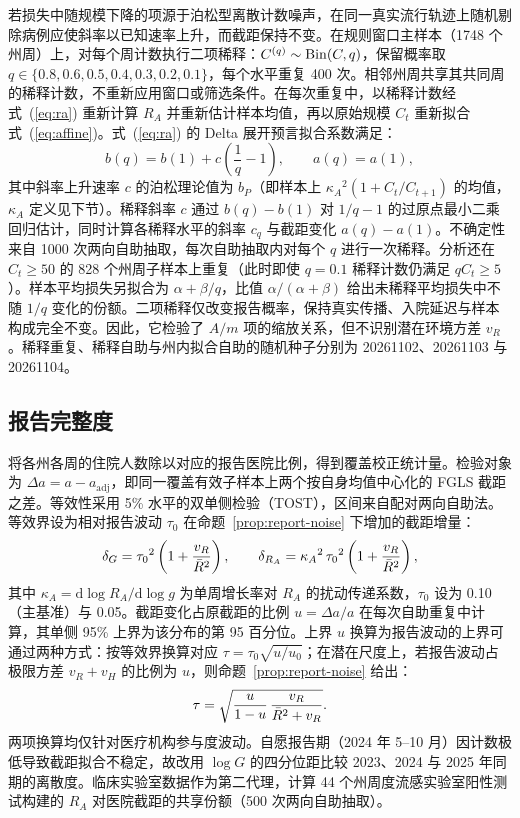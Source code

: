 若损失中随规模下降的项源于泊松型离散计数噪声，在同一真实流行轨迹上随机剔除病例应使斜率以已知速率上升，而截距保持不变。在规则窗口主样本（1748 个州周）上，对每个周计数执行二项稀释：$C^{(q)}\sim\mathrm{Bin}(C,q)$，保留概率取 $q\in\{0.8,0.6,0.5,0.4,0.3,0.2,0.1\}$，每个水平重复 400 次。相邻州周共享其共同周的稀释计数，不重新应用窗口或筛选条件。在每次重复中，以稀释计数经式~(\ref{eq:ra}) 重新计算 $R_A$ 并重新估计样本均值，再以原始规模 $C_t$ 重新拟合式~(\ref{eq:affine})。式~(\ref{eq:ra}) 的 Delta 展开预言拟合系数满足：
\begin{equation}
  b(q)=b(1)+c\left(\frac{1}{q}-1\right),\qquad a(q)=a(1),
  \label{eq:thinning}
\end{equation}
其中斜率上升速率 $c$ 的泊松理论值为 $b_P$（即样本上 $\kappa_A{}^2(1+C_t/C_{t+1})$ 的均值，$\kappa_A$ 定义见下节）。稀释斜率 $c$ 通过 $b(q)-b(1)$ 对 $1/q-1$ 的过原点最小二乘回归估计，同时计算各稀释水平的斜率 $c_q$ 与截距变化 $a(q)-a(1)$。不确定性来自 1000 次两向自助抽取，每次自助抽取内对每个 $q$ 进行一次稀释。分析还在 $C_t\ge50$ 的 828 个州周子样本上重复（此时即使 $q=0.1$ 稀释计数仍满足 $qC_t\ge5$）。样本平均损失另拟合为 $\alpha+\beta/q$，比值 $\alpha/(\alpha+\beta)$ 给出未稀释平均损失中不随 $1/q$ 变化的份额。二项稀释仅改变报告概率，保持真实传播、入院延迟与样本构成完全不变。因此，它检验了 $A/m$ 项的缩放关系，但不识别潜在环境方差 $v_R$。稀释重复、稀释自助与州内拟合自助的随机种子分别为 20261102、20261103 与 20261104。

\subsection{报告完整度}
\label{sec:meth-reporting}

将各州各周的住院人数除以对应的报告医院比例，得到覆盖校正统计量。检验对象为 $\Delta a=a-a_{\mathrm{adj}}$，即同一覆盖有效子样本上两个按自身均值中心化的 FGLS 截距之差。等效性采用 5\% 水平的双单侧检验（TOST），区间来自配对两向自助法\citep{schuirmann1987comparison}。等效界设为相对报告波动 $\tau_0$ 在命题~\ref{prop:report-noise} 下增加的截距增量：
\begin{equation}
  \delta_G=\tau_0{}^2\left(1+\frac{v_R}{\bar{R}^2}\right),\qquad
  \delta_{R_A}=\kappa_A{}^2\,\tau_0{}^2\left(1+\frac{v_R}{\bar{R}^2}\right),
  \label{eq:tost}
\end{equation}
其中 $\kappa_A=\mathrm{d}\log R_A/\mathrm{d}\log g$ 为单周增长率对 $R_A$ 的扰动传递系数，$\tau_0$ 设为 0.10（主基准）与 0.05。截距变化占原截距的比例 $u=\Delta a/a$ 在每次自助重复中计算，其单侧 95\% 上界为该分布的第 95 百分位。上界 $u$ 换算为报告波动的上界可通过两种方式：按等效界换算对应 $\tau=\tau_0\sqrt{u/u_0}$；在潜在尺度上，若报告波动占极限方差 $v_R+v_H$ 的比例为 $u$，则命题~\ref{prop:report-noise} 给出：
\begin{equation}
  \tau=\sqrt{\frac{u}{1-u}\,\frac{v_R}{\bar{R}^2+v_R}}.
  \label{eq:tau-latent}
\end{equation}
两项换算均仅针对医疗机构参与度波动。自愿报告期（2024 年 5--10 月）因计数极低导致截距拟合不稳定，故改用 $\log G$ 的四分位距比较 2023、2024 与 2025 年同期的离散度。临床实验室数据作为第二代理，计算 44 个州周度流感实验室阳性测试构建的 $R_A$ 对医院截距的共享份额（500 次两向自助抽取）。

